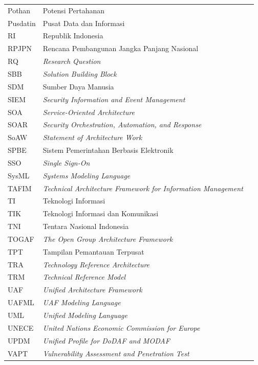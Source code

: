 \begin{longtable}{@{} l >{\raggedright\arraybackslash}p{7.2cm} c @{}}
Pothan & Potensi Pertahanan & \pageref{sk:Pothan} \\
Pusdatin & Pusat Data dan Informasi & \pageref{sk:Pusdatin} \\
RI & Republik Indonesia & \pageref{sk:RI} \\
RPJPN & Rencana Pembangunan Jangka Panjang Nasional & \pageref{sk:RPJPN} \\
RQ & \textit{Research Question} & \pageref{sk:RQ} \\
SBB & \textit{Solution Building Block} & \pageref{sk:SBB} \\
SDM & Sumber Daya Manusia & \pageref{sk:SDM} \\
SIEM & \textit{Security Information and Event Management} & \pageref{sk:SIEM} \\
SOA & \textit{Service-Oriented Architecture} & \pageref{sk:SOA} \\
SOAR & \textit{Security Orchestration, Automation, and Response} & \pageref{sk:SOAR} \\
SoAW & \textit{Statement of Architecture Work} & \pageref{sk:SoAW} \\
SPBE & Sistem Pemerintahan Berbasis Elektronik & \pageref{sk:SPBE} \\
SSO & \textit{Single Sign-On} & \pageref{sk:SSO} \\
SysML & \textit{Systems Modeling Language} & \pageref{sk:SysML} \\
TAFIM & \textit{Technical Architecture Framework for Information Management} & \pageref{sk:TAFIM} \\
TI & Teknologi Informasi & \pageref{sk:TI} \\
TIK & Teknologi Informasi dan Komunikasi & \pageref{sk:TIK} \\
TNI & Tentara Nasional Indonesia & \pageref{sk:TNI} \\
TOGAF & \textit{The Open Group Architecture Framework} & \pageref{sk:TOGAF} \\
TPT & Tampilan Pemantauan Terpusat & \pageref{sk:TPT} \\
TRA & \textit{Technology Reference Architecture} & \pageref{sk:TRA} \\
TRM & \textit{Technical Reference Model} & \pageref{sk:TRM} \\
UAF & \textit{Unified Architecture Framework} & \pageref{sk:UAF} \\
UAFML & \textit{UAF Modeling Language} & \pageref{sk:UAFML} \\
UML & \textit{Unified Modeling Language} & \pageref{sk:UML} \\
UNECE & \textit{United Nations Economic Commission for Europe} & \pageref{sk:UNECE} \\
UPDM & \textit{Unified Profile for DoDAF and MODAF} & \pageref{sk:UPDM} \\
VAPT & \textit{Vulnerability Assessment and Penetration Test} & \pageref{sk:VAPT} \\
\end{longtable}
